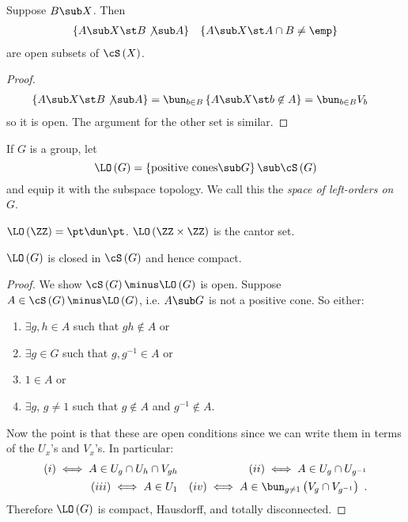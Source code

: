 
\begin{lem}
Suppose $B\sub X$. Then
\begin{align*}
\left\{A\sub X \st B\not \sub A\right\}
&&
\left\{A\sub X \st A\cap B\neq \emp\right\}
\end{align*}
are open subsets of $\cS\left(X\right)$.
\label{lem:2.1}
\end{lem}

\begin{proof}
\begin{align*}
\left\{A\sub X \st B\not \sub A\right\} &=
\bun_{b\in B} \left\{A\sub X \st b\not\in A\right\} = \bun_{b\in B} V_b
\end{align*}
so it is open. The argument for the other set is similar.
\end{proof}

If $G$ is a group, let 
\begin{equation}
\LO\left(G\right) = \left\{\text{positive cones}\sub G\right\}\sub \cS\left(G\right)
\end{equation}
and equip it 
with the subspace topology. 
We call this the \emph{space of left-orders on $G$}.

\begin{exm}
$\LO\left(\ZZ\right) = \pt \dun \pt$.
$\LO\left(\ZZ\times \ZZ\right)$ is the cantor set.
\end{exm}

\begin{thm}
$\LO\left(G\right)$ is closed in $\cS\left(G\right)$ and hence compact.
\label{thm:2.2}
\end{thm}

\begin{proof}
We show $\cS\left(G\right)\minus \LO\left(G\right)$ is open. Suppose $A\in
\cS\left(G\right)\minus \LO\left(G\right)$, i.e. $A\sub G$ is not a positive cone. 
So either:
\begin{enumerate}[label = (\iii)]
\item $\exists g,h\in A$ such that $gh\not\in A$ or
\item $\exists g\in G$ such that $g,g^{-1} \in A$ or
\item $1\in A$ or
\item $\exists g$, $g\neq 1$ such that $g\not\in A$ and $g^{-1} \not\in A$.
\end{enumerate}
Now the point is that these are open conditions since we can write them in terms of the
$U_x$'s and $V_x$'s.
In particular:
\begin{align*}
\left(i\right) \iff
A\in U_g\cap U_h \cap V_{gh}
&&
\left(ii\right)\iff A\in U_g\cap U_{g^{-1}} \\
\left(iii\right)\iff A\in U_1 
&&
\left(iv\right) \iff A\in \bun_{g\neq 1} \left(V_g \cap V_{g^{-1}}\right) \ .
\end{align*}
Therefore $\LO\left(G\right)$ is compact, Hausdorff, and totally disconnected.
\end{proof}

